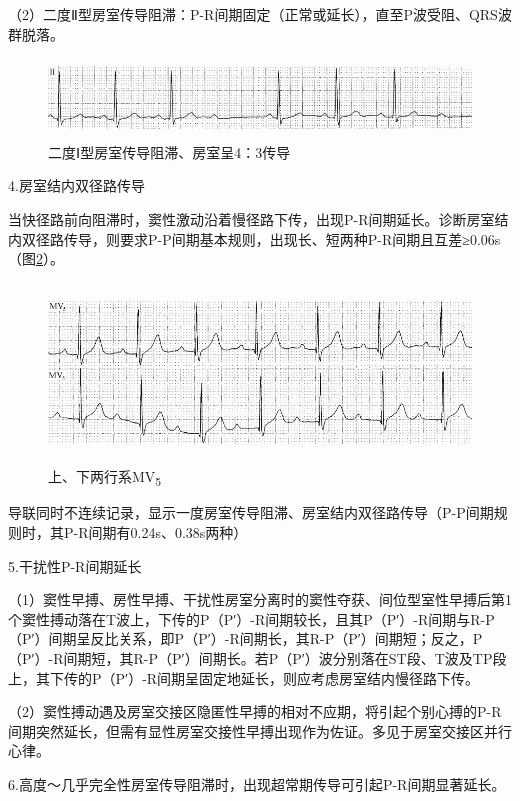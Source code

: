 （2）二度Ⅱ型房室传导阻滞：P-R间期固定（正常或延长），直至P波受阻、QRS波群脱落。

\begin{figure}[!htbp]
 \centering
 \includegraphics[width=5.58333in,height=0.83333in]{./images/Image00045.jpg}
 \captionsetup{justification=centering}
 \caption{二度Ⅰ型房室传导阻滞、房室呈4：3传导}
 \label{fig2-10}
  \end{figure} 

4.房室结内双径路传导

当快径路前向阻滞时，窦性激动沿着慢径路下传，出现P-R间期延长。诊断房室结内双径路传导，则要求P-P间期基本规则，出现长、短两种P-R间期且互差≥0.06s（图\ref{fig2-11}）。

\begin{figure}[!htbp]
 \centering
 \includegraphics[width=5.58333in,height=1.875in]{./images/Image00046.jpg}
 \captionsetup{justification=centering}
 \caption{上、下两行系MV\textsubscript{5}}
 \label{fig2-11}
  \end{figure} 
导联同时不连续记录，显示一度房室传导阻滞、房室结内双径路传导（P-P间期规则时，其P-R间期有0.24s、0.38s两种）

5.干扰性P-R间期延长

（1）窦性早搏、房性早搏、干扰性房室分离时的窦性夺获、间位型室性早搏后第1个窦性搏动落在T波上，下传的P（P′）-R间期较长，且其P（P′）-R间期与R-P（P′）间期呈反比关系，即P（P′）-R间期长，其R-P（P′）间期短；反之，P（P′）-R间期短，其R-P（P′）间期长。若P（P′）波分别落在ST段、T波及TP段上，其下传的P（P′）-R间期呈固定地延长，则应考虑房室结内慢径路下传。

（2）窦性搏动遇及房室交接区隐匿性早搏的相对不应期，将引起个别心搏的P-R间期突然延长，但需有显性房室交接性早搏出现作为佐证。多见于房室交接区并行心律。

6.高度～几乎完全性房室传导阻滞时，出现超常期传导可引起P-R间期显著延长。

